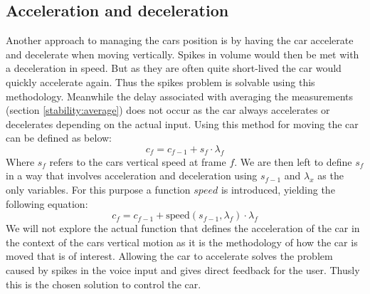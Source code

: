 \subsection{Acceleration and deceleration}\label{stability:acceleration}
Another approach to managing the cars position is by having the car accelerate and decelerate when moving vertically.
Spikes in volume would then be met with a deceleration in speed.
But as they are often quite short-lived the car would quickly accelerate again.
Thus the spikes problem is solvable using this methodology.
Meanwhile the delay associated with averaging the measurements (section \ref{stability:average}) does not occur as the car always accelerates or decelerates depending on the actual input.
Using this method for moving the car can be defined as below:
$$c_f = c_{f-1} + s_f \cdot \lambda_f$$
Where $s_f$ refers to the cars vertical speed at frame $f$.
We are then left to define $s_f$ in a way that involves acceleration and deceleration using $s_{f-1}$ and $\lambda_x$ as the only variables.
For this purpose a function $speed$ is introduced, yielding the following equation:
$$c_f = c_{f-1} + \text{speed}(s_{f-1}, \lambda_f) \cdot \lambda_f$$
We will not explore the actual function that defines the acceleration of the car in the context of the cars vertical motion as it is the methodology of how the car is moved that is of interest.
Allowing the car to accelerate solves the problem caused by spikes in the voice input and gives direct feedback for the user.
Thusly this is the chosen solution to control the car.